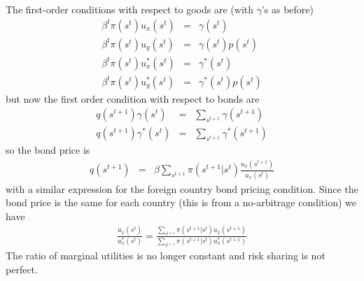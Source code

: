 \documentclass[11pt,pdftex,twoside,letterpaper]{exam}
\begin{document}
The first-order conditions with respect to goods are (with $\gamma$'s as before)
\begin{eqnarray}
  \beta^t\pi(s^t)u_x(s^t) &=& \gamma(s^t) \\
  \beta^t\pi(s^t)u_y(s^t) &=& \gamma(s^t) p(s^t)\\
  \beta^t\pi(s^t)u_x^*(s^t) &=& \gamma^*(s^t) \\
  \beta^t\pi(s^t)u_y^*(s^t) &=& \gamma^*(s^t)  p(s^t)
\end{eqnarray}
but now the first order condition with respect to bonds are
\begin{eqnarray}
  q(s^{t+1})\gamma(s^t) &=& \sum_{s^{t+1}}\gamma(s^{t+1})\\
  q(s^{t+1})\gamma^*(s^t) &=& \sum_{s^{t+1}}\gamma^*(s^{t+1})
\end{eqnarray}
 so the bond price is
 \begin{eqnarray}
   q(s^{t+1}) &=& \beta \sum_{s^{t+1}}\pi(s^{t+1}|s^t)\frac{u_x(s^{t+1})}{u_x(s^t)}
 \end{eqnarray}
 with a similar expression for the foreign country bond pricing condition. Since the bond price is the same for each country (this is from a no-arbitrage condition) we have
 \begin{eqnarray}
   \frac{u_x(s^t)}{u_x^*(s^t)}=\frac{\sum_{s^{t+1}}\pi(s^{t+1}|s^t)u_x(s^{t+1})}{\sum_{s^{t+1}}\pi(s^{t+1}|s^t)u_x^*(s^{t+1})}
 \end{eqnarray}
 The ratio of marginal utilities is no longer constant and risk sharing is not perfect.
\end{document}
